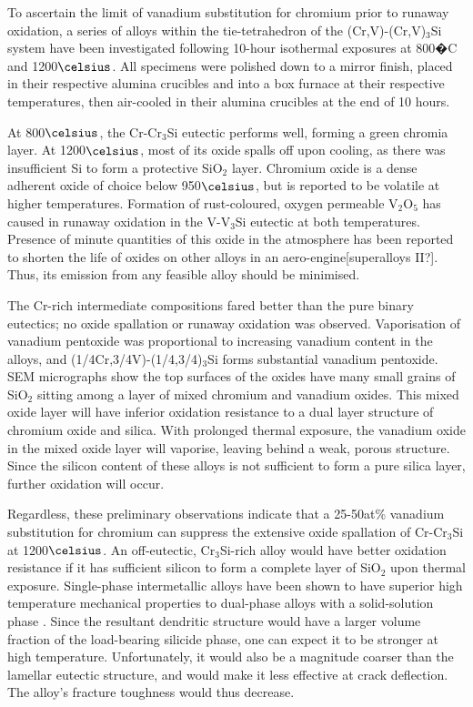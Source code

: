 \documentclass[preprint]{elsarticle}
\begin{document}
To ascertain the limit of vanadium substitution for chromium prior to runaway oxidation, a series of alloys within the tie-tetrahedron of the (Cr,V)-(Cr,V)$_3$Si system have been investigated following 10-hour isothermal exposures at 800�C and 1200$\celsius$. All specimens were polished down to a mirror finish, placed in their respective alumina crucibles and into a box furnace at their respective temperatures, then air-cooled in their alumina crucibles at the end of 10 hours.  

At 800$\celsius$, the Cr-Cr$_3$Si eutectic performs well, forming a green chromia layer. At 1200$\celsius$, most of its oxide spalls off upon cooling, as there was insufficient Si to form a protective SiO$_2$ layer. Chromium oxide is a dense adherent oxide of choice below 950$\celsius$, but is reported to be volatile at higher temperatures.
Formation of rust-coloured, oxygen permeable V$_2$O$_5$ has caused in runaway oxidation in the V-V$_3$Si eutectic at both temperatures. Presence of minute quantities of this oxide in the atmosphere has been reported to shorten the life of oxides on other alloys in an aero-engine[superalloys II?]. Thus, its emission from any feasible alloy should be minimised.

The Cr-rich intermediate compositions fared better than the pure binary eutectics; no oxide spallation or runaway oxidation was observed. Vaporisation of vanadium pentoxide was proportional to increasing vanadium content in the alloys, and (1/4Cr,3/4V)-(1/4,3/4)$_3$Si forms substantial vanadium pentoxide. 
SEM micrographs show the top surfaces of the oxides have many small grains of SiO$_2$ sitting among a layer of mixed chromium and vanadium oxides. This mixed oxide layer will have inferior oxidation resistance to a dual layer structure of chromium oxide and silica. With prolonged thermal exposure, the vanadium oxide in the mixed oxide layer will vaporise, leaving behind a weak, porous structure. Since the silicon content of these alloys is not sufficient to form a pure silica layer, further oxidation will occur.

Regardless, these preliminary observations indicate that a 25-50at\% vanadium substitution for chromium can suppress the extensive oxide spallation of Cr-Cr$_3$Si at 1200$\celsius$. An off-eutectic, Cr$_3$Si-rich alloy would have better oxidation resistance if it has sufficient silicon to form a complete layer of SiO$_2$ upon thermal exposure. 
Single-phase intermetallic alloys have been shown to have superior high temperature mechanical properties to dual-phase alloys with a solid-solution phase \cite{shah92}. Since the resultant dendritic structure would have a larger volume fraction of the load-bearing silicide phase, one can expect it to be stronger at high temperature. Unfortunately, it would also be a magnitude coarser than the lamellar eutectic structure, and would make it less effective at crack deflection. The alloy's fracture toughness would thus decrease. 
\end{document}
